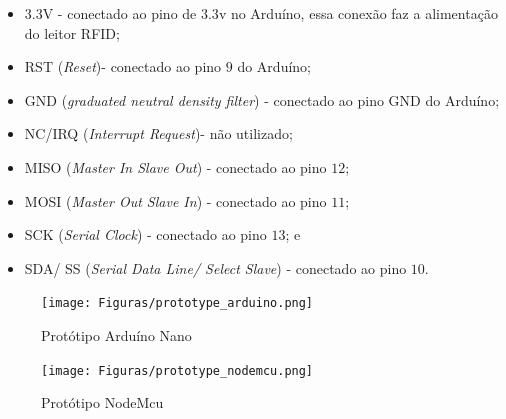 \begin{itemize}
    \item $3.3$V - conectado ao pino de $3.3$v no Arduíno, essa conexão faz a alimentação do leitor RFID;
    \item RST (\textit{Reset})- conectado ao pino $9$ do Arduíno;
    \item GND (\textit{graduated neutral density filter}) - conectado ao pino GND do Arduíno;
    \item NC/IRQ (\textit{Interrupt Request})- não utilizado;
    \item MISO (\textit{Master In Slave Out}) - conectado ao pino $12$;
    \item MOSI  (\textit{Master Out Slave In}) - conectado ao pino $11$;
    \item SCK  (\textit{Serial Clock}) - conectado ao pino $13$; e 
    \item SDA/ SS (\textit{Serial Data Line/ Select Slave}) - conectado ao pino $10$.
\end{itemize}    

\begin{figure}[H]
              \caption{\label{fig:prototipo_arduino}{Protótipo Arduíno Nano}}
              \centering
              \texttt{[image: Figuras/prototype\_arduino.png]}            
\end{figure}\begin{figure}[H]
              \caption{\label{fig:prototipo_nodemcu}{Protótipo NodeMcu}}
              \centering
              \texttt{[image: Figuras/prototype\_nodemcu.png]}
\end{figure}



